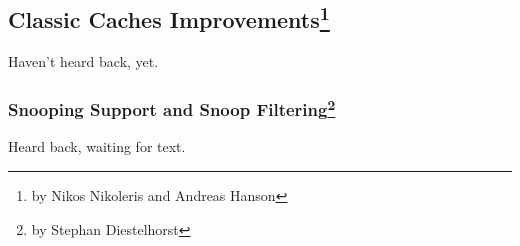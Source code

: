 \subsection[Classic Caches Improvements]{Classic Caches Improvements\footnote{by Nikos Nikoleris and Andreas Hanson}}

Haven't heard back, yet.

\subsubsection[Snooping Support and Snoop Filtering]{Snooping Support and Snoop Filtering\footnote{by Stephan Diestelhorst}}

Heard back, waiting for text.
